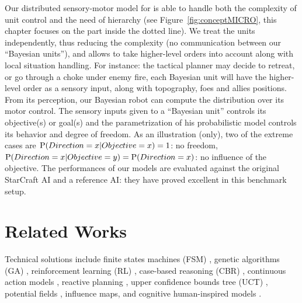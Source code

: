 Our distributed sensory-motor model for  is able to handle both the complexity of unit control and the need of hierarchy (see Figure~\ref{fig:conceptMICRO}, this chapter focuses on the part inside the dotted line). We treat the units independently, thus reducing the complexity (no communication between our ``Bayesian units''), and allows to take higher-level orders into account along with local situation handling. For instance: the tactical planner may decide to retreat, or go through a choke under enemy fire, each Bayesian unit will have the higher-level order as a sensory input, along with topography, foes and allies positions. From its perception, our Bayesian robot \cite{Lebeltel04} can compute the distribution over its motor control. The sensory inputs given to a ``Bayesian unit'' controls its objective(s) or goal(s) and the parametrization of his probabilistic model controls its behavior and degree of freedom. As an illustration (only), two of the extreme cases are $\mathrm{P}(Direction=x|Objective=x)=1$: no freedom, $\mathrm{P}(Direction=x|Objective=y)=\mathrm{P}(Direction=x)$: no influence of the objective. The performances of our models are evaluated against the original StarCraft AI and a reference AI: they have proved excellent in this benchmark setup.


\section{Related Works}
Technical solutions include finite states machines (FSM) \citep{FSM}, genetic algorithms (GA) \citep{GA,Bakkes04,teamCompositionRTS}, reinforcement learning (RL) \citep{Marthi05concurrenthierarchical,Madeira06}, case-based reasoning (CBR) \citep{LTW,CBR-RL}, continuous action models \citep{Molineaux08}, reactive planning \citep{WeberCIG10}, upper confidence bounds tree (UCT) \citep{UCT}, potential fields \citep{Hagelback2009}, influence maps\citep{teamCompositionRTS}, and cognitive human-inspired models \citep{SORTS}.

